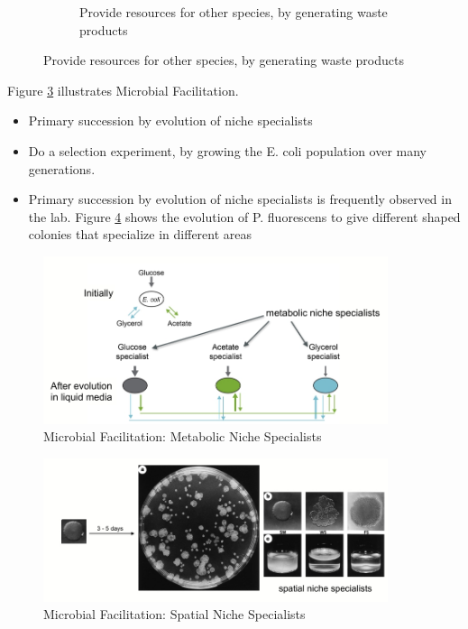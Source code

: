 \documentclass[]{article}
\begin{document}
\begin{figure}[H]
\begin{subfigure}[b]{0.45\textwidth}
		\caption{Provide resources for other species,
			by generating waste products}
		\label{fig:Harsh4}
	\end{subfigure}
	
\end{figure}

Figure \ref{fig:EColiEvolution} illustrates Microbial Facilitation\cite{escalante2015ecological}.
\begin{itemize}
	\item Primary succession by evolution of niche specialists
	\item Do a selection experiment, by growing the E. coli population over many generations.
	\item Primary succession by evolution of niche specialists is frequently observed in the lab. Figure \ref{fig:NicheSpecialization}\cite{rainey1998adaptive} shows the evolution of P. fluorescens to give different shaped colonies that specialize in different areas 
\end{itemize}

\begin{figure}[H]
	\caption{Microbial Facilitation: Metabolic Niche Specialists}\label{fig:EColiEvolution}
	\includegraphics[width=0.9\textwidth]{EColiEvolution}
\end{figure}

\begin{figure}[H]
	\caption{Microbial Facilitation: Spatial Niche Specialists}\label{fig:NicheSpecialization}
	\includegraphics[width=0.9\textwidth]{NicheSpecialization}
\end{figure}
\end{document}
